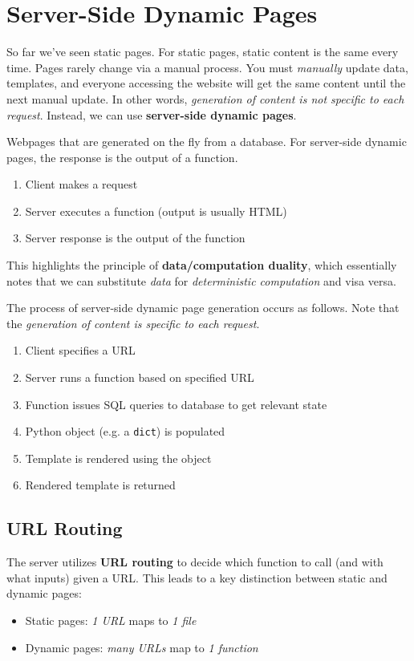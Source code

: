 \section{Server-Side Dynamic Pages}
So far we've seen static pages. For static pages, static content is the same every time. Pages rarely change via a manual process. You must \emph{manually} update data, templates, and everyone accessing the website will get the same content until the next manual update. In other words, \emph{generation of content is not specific to each request}. Instead, we can use \textbf{server-side dynamic pages}.

\begin{definition}
	Webpages that are generated on the fly from a database. For server-side dynamic pages, the response is the output of a function.
	\begin{enumerate}
		\item Client makes a request
		\item Server executes a function (output is usually HTML)
		\item Server response is the output of the function
	\end{enumerate}
\end{definition}

This highlights the principle of \textbf{data/computation duality}, which essentially notes that we can substitute \emph{data} for \emph{deterministic computation} and visa versa. \par

The process of server-side dynamic page generation occurs as follows. Note that the \emph{generation of content is specific to each request}.
\begin{enumerate}[label=\roman*.]
	\item Client specifies a URL
	\item Server runs a function based on specified URL
	\item Function issues SQL queries to database to get relevant state
	\item Python object (e.g. a \texttt{dict}) is populated
	\item Template is rendered using the object
	\item Rendered template is returned
\end{enumerate}

\subsection{URL Routing}
The server utilizes \textbf{URL routing} to decide which function to call (and with what inputs) given a URL. This leads to a key distinction between static and dynamic pages:
\begin{itemize}
	\item Static pages: \emph{1 URL} maps to \emph{1 file}
	\item Dynamic pages: \emph{many URLs} map to \emph{1 function}
\end{itemize}


